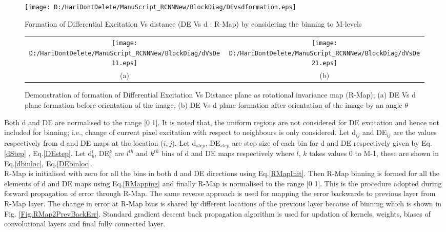 \begin{figure*}
 \centering
 \texttt{[image: D:/HariDontDelete/ManuScript\_RCNNNew/BlockDiag/DEvsdformation.eps]}
 \caption{Formation of Differential Excitation Vs distance (DE Vs d : R-Map) by considering the binning to M-levels}
 \label{Fig:DEVsDEMainIdea}
\end{figure*}

\begin{figure*}
\begin{tabular}{cc}
\texttt{[image: D:/HariDontDelete/ManuScript\_RCNNNew/BlockDiag/dVsDe11.eps]}&\texttt{[image: D:/HariDontDelete/ManuScript\_RCNNNew/BlockDiag/dVsDe21.eps]}\\
(a)  & (b) \\
\end{tabular}
\caption{ Demonstration of formation of Differential Excitation Vs Distance plane as rotational invariance map (R-Map); (a) DE Vs d plane formation before orientation of the image, (b) DE Vs d plane formation after orientation of the image by an angle $\theta$}
\label{Fig.DeVsDPlaneDemo}
\end{figure*}

Both d and DE are normalised to the range [0 1]. It is noted that, the uniform regions are not considered for DE excitation and hence not included for binning; i.e., change of current pixel excitation with respect to neighbours is only considered.  Let d$_{ij}$ and DE$_{ij}$ are the values respectively from d and DE maps at the location ($i,j$). Let d$_{step}$, DE$_{step}$ are step size of each bin for d and DE respectively given by Eq.\ref{dStep} , Eq.\ref{DEstep}. Let d$^{l}_{b}$, DE$^{k}_{b}$ are $l^{th}$ and $k^{th}$ bins of d and DE maps respectively where $l$, $k$ takes values 0 to M-1, these are shown in Eq.\ref{dbinloc}, Eq.\ref{DEbinloc}. \\

R-Map is initialised with zero for all the bins in both d and DE directions using Eq.\ref{RMapInit}. Then R-Map binning is formed for all the elements of d and DE maps using Eq.\ref{RMapping} and finally R-Map is normalised to the range [0 1]. This is the procedure adopted during forward propagation of error through R-Map. The same reverse approach is used for mapping the error backwards to previous layer from R-Map layer. The change in error at R-Map bins is shared by different locations of the previous layer because of binning which is shown in Fig. \ref{Fig:RMap2PrevBackErr}. Standard gradient descent back propagation algorithm \cite{P14}\cite{RCNN15} is used for updation of kernels, weights, biases of convolutional layers and final fully connected layer. \\

